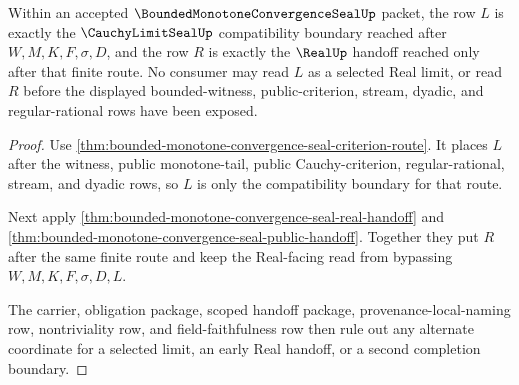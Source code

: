 \begin{theorem}
\label{thm:bounded-monotone-convergence-seal-exactness-envelope}
Within an accepted $\BoundedMonotoneConvergenceSealUp$ packet, the row $L$ is exactly the $\CauchyLimitSealUp$ compatibility boundary reached after $W,M,K,F,\sigma,D$, and the row $R$ is exactly the $\RealUp$ handoff reached only after that finite route. No consumer may read $L$ as a selected Real limit, or read $R$ before the displayed bounded-witness, public-criterion, stream, dyadic, and regular-rational rows have been exposed.
\end{theorem}
\begin{proof}
Use \autoref{thm:bounded-monotone-convergence-seal-criterion-route}. It places $L$ after the witness, public monotone-tail, public Cauchy-criterion, regular-rational, stream, and dyadic rows, so $L$ is only the compatibility boundary for that route.

Next apply \autoref{thm:bounded-monotone-convergence-seal-real-handoff} and \autoref{thm:bounded-monotone-convergence-seal-public-handoff}. Together they put $R$ after the same finite route and keep the Real-facing read from bypassing $W,M,K,F,\sigma,D,L$.

The carrier, obligation package, scoped handoff package, provenance-local-naming row, nontriviality row, and field-faithfulness row then rule out any alternate coordinate for a selected limit, an early Real handoff, or a second completion boundary.
\end{proof}

